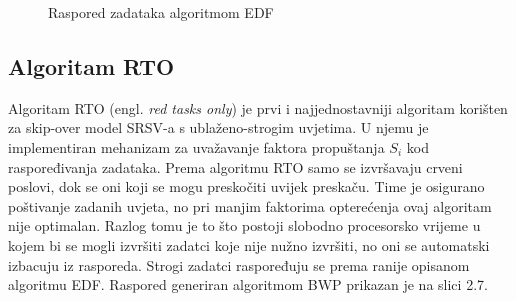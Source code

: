 \documentclass[../zavrsni.tex]{subfiles}
\begin{document}
\begin{figure}[h!]
    \centering

    \begin{RTGrid}[width=13cm]{3}{24}

  

  

  

    \end{RTGrid}

    \caption{Raspored zadataka algoritmom EDF}
    \label{fig:ex1}
  \end{figure}

\subsection{Algoritam RTO}

Algoritam RTO (engl. \textit{red tasks only}) je prvi i najjednostavniji algoritam korišten za skip-over model SRSV-a s ublaženo-strogim uvjetima.
U njemu je implementiran mehanizam za uvažavanje faktora propuštanja $S_i$ kod raspoređivanja zadataka.
Prema algoritmu RTO samo se izvršavaju crveni poslovi, dok se oni koji se mogu preskočiti uvijek preskaču. 
Time je osigurano poštivanje zadanih uvjeta, no pri manjim 
faktorima opterećenja ovaj algoritam nije optimalan. Razlog tomu je to što postoji slobodno procesorsko vrijeme u kojem bi se mogli 
izvršiti zadatci koje nije nužno izvršiti, no oni se automatski izbacuju iz rasporeda. Strogi zadatci raspoređuju se prema 
ranije opisanom algoritmu EDF. Raspored generiran algoritmom BWP prikazan je na slici 2.7. 
\end{document}

